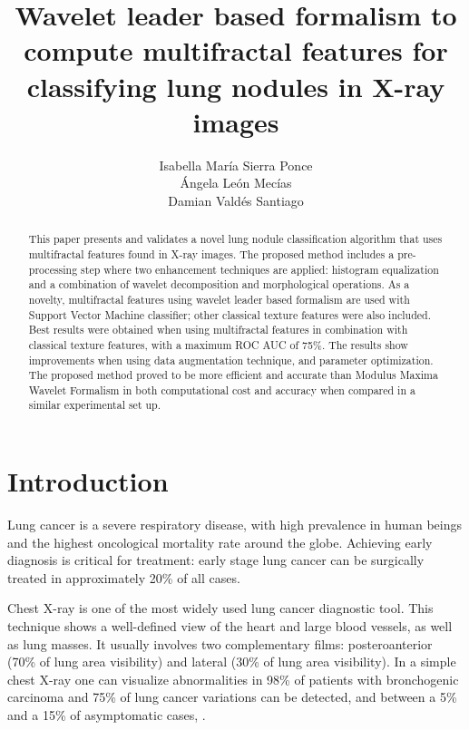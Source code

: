 \documentclass{article}
\title{Wavelet leader based formalism to compute multifractal features for classifying lung nodules in X-ray images}
\author{Isabella María Sierra Ponce\\
	\And
Ángela León Mecías\\ \And
 Damian Valdés Santiago
}
\begin{document}
\maketitle

\begin{abstract}
This paper presents and validates a novel lung nodule classification algorithm that uses multifractal features found in X-ray images. The proposed method includes a pre-processing step where two enhancement techniques are applied: histogram equalization and a combination of wavelet decomposition and morphological operations. As a novelty, multifractal features using wavelet leader based formalism are used with Support Vector Machine classifier; other classical texture features were also included. Best results were obtained when using multifractal features in combination with classical texture features, with a maximum ROC AUC of 75\%. The results show improvements when using data augmentation technique, and parameter optimization. The proposed method proved to be more efficient and accurate than Modulus Maxima Wavelet Formalism in both computational cost and accuracy when compared in a similar experimental set up. 
\end{abstract}





\section{Introduction}
	Lung cancer is a severe respiratory disease, with high prevalence in human beings and the highest oncological mortality rate around the globe. Achieving early diagnosis is critical for treatment: early stage lung cancer can be surgically treated in approximately 20\% of all cases. 

Chest X-ray is one of the most widely used lung cancer diagnostic tool. This technique shows a well-defined view of the heart and large blood vessels, as well as lung masses. It usually involves two complementary films: posteroanterior (70\% of lung area visibility) and lateral (30\% of lung area visibility). In a simple chest X-ray one can visualize abnormalities in 98\% of patients with bronchogenic carcinoma and 75\% of lung cancer variations can be detected, and between a 5\% and a 15\% of asymptomatic cases, \citep{kelly2012chest}.
\end{document}
